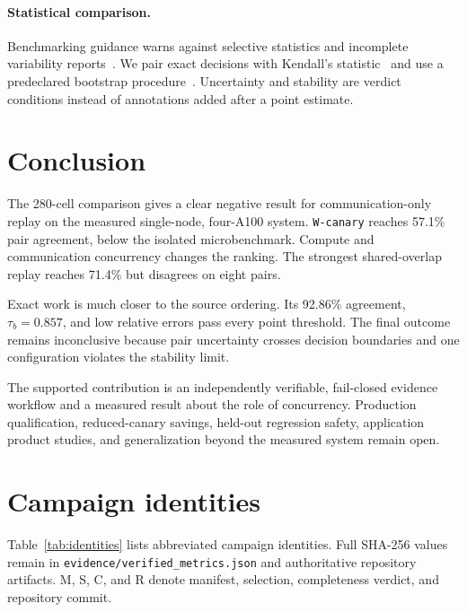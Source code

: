 \documentclass[10pt,twocolumn]{article}
\newcommand{\wname}[1]{\texttt{W-#1}}
\begin{document}
\paragraph{Statistical comparison.} Benchmarking guidance warns against
selective statistics and incomplete variability reports~\cite{benchmarking}.
We pair exact decisions with Kendall's statistic~\cite{kendall} and use a
predeclared bootstrap procedure~\cite{efron}. Uncertainty and stability are
verdict conditions instead of annotations added after a point estimate.

\section{Conclusion}

The 280-cell comparison gives a clear negative result for communication-only
replay on the measured single-node, four-A100 system. \wname{canary} reaches
57.1\% pair agreement, below the isolated microbenchmark. Compute and
communication concurrency changes the ranking. The strongest shared-overlap
replay reaches 71.4\% but disagrees on eight pairs.

Exact work is much closer to the source ordering. Its 92.86\% agreement,
$\tau_b=0.857$, and low relative errors pass every point threshold. The final
outcome remains inconclusive because pair uncertainty crosses decision
boundaries and one configuration violates the stability limit.

The supported contribution is an independently verifiable, fail-closed
evidence workflow and a measured result about the role of concurrency.
Production qualification, reduced-canary savings, held-out regression safety,
application product studies, and generalization beyond the measured system
remain open.




\appendix
\section{Campaign identities}

Table~\ref{tab:identities} lists abbreviated campaign identities. Full SHA-256
values remain in \texttt{evidence/verified\_metrics.json} and authoritative
repository artifacts. M, S, C, and R denote manifest, selection, completeness
verdict, and repository commit.
\end{document}
